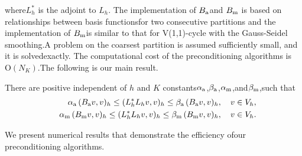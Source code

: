 \documentclass{report}
\begin{document}
where$L_h^*$ is the adjoint to $L_h$.
The implementation of $B_{\textup{\scriptsize a}}$and $B_{\textup{\scriptsize m}}$ is based on relationships between basis functionsfor two consecutive partitions and the implementation of $B_{\textup{\scriptsize m}}$is similar to that for V(1,1)-cycle with the Gauss-Seidel smoothing.A problem on the coarsest partition is assumed sufficiently small,
and it is solvedexactly.
The computational cost of the preconditioning algorithms is $\mbox{O}(N_K)$.The following is our main result.\begin{theorem}There are positive independent of $h$ and $K$ constants$\alpha_{\textup{\scriptsize a}}$,$\beta_{\textup{\scriptsize a}}$,$\alpha_{\textup{\scriptsize m}}$,and$\beta_{\textup{\scriptsize m}}$,such that\begin{eqnarray}\label{eq:spectral_equiv}&&\alpha_{\textup{\scriptsize a}}\,
(B_{\textup{\scriptsize a}}v,v)_h\leq (L_h^*L_hv,v)_h \leq\beta_{\textup{\scriptsize a}}\,
(B_{\textup{\scriptsize a}}v,v)_h,\quad v\in V_h,\\\nonumber&&\alpha_{\textup{\scriptsize m}}\,
(B_{\textup{\scriptsize m}}v,v)_h\leq (L_h^*L_hv,v)_h \leq\beta_{\textup{\scriptsize m}}\,
(B_{\textup{\scriptsize m}}v,v)_h,\quad v\in V_h.\end{eqnarray}\end{theorem}We present numerical results that demonstrate the efficiency ofour preconditioning algorithms.
\end{document}

